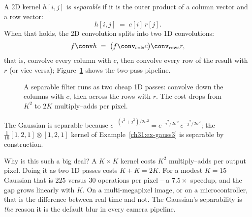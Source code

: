 A 2D kernel $h[i,j]$ is \emph{separable} if it is the outer product of a column
vector and a row vector:
\begin{equation}
h[i,j] \;=\; c[i]\, r[j].
\label{ch31:sep}
\end{equation}
When that holds, the 2D convolution splits into two 1D convolutions:
\begin{equation}
f \conv h \;=\; \big(f \conv_{\text{cols}} c\big) \conv_{\text{rows}} r,
\label{ch31:sepconv}
\end{equation}
that is, convolve every column with $c$, then convolve every row of the result with
$r$ (or vice versa); Figure~\ref{ch31:fig-sep} shows the two-pass pipeline.

\begin{figure}[H]
\centering
{}
\caption{A separable filter runs as two cheap 1D passes: convolve down the columns
with $c$, then across the rows with $r$. The cost drops from $K^2$ to $2K$
multiply--adds per pixel.}
\label{ch31:fig-sep}
\end{figure} The Gaussian is separable because
$e^{-(i^2+j^2)/2\sigma^2} = e^{-i^2/2\sigma^2}\,e^{-j^2/2\sigma^2}$; the
$\frac1{16}[1,2,1]\otimes[1,2,1]$ kernel of Example~\ref{ch31:ex-gauss3} is
separable by construction.

\begin{whybox}
Why is this such a big deal? A $K\times K$ kernel costs $K^2$ multiply--adds per
output pixel. Doing it as two 1D passes costs $K + K = 2K$. For a modest $K=15$
Gaussian that is $225$ versus $30$ operations per pixel -- a $7.5\times$ speedup, and
the gap grows linearly with $K$. On a multi-megapixel image, or on a
microcontroller, that is the difference between real time and not. The Gaussian's
separability is \emph{the} reason it is the default blur in every camera pipeline.
\end{whybox}

